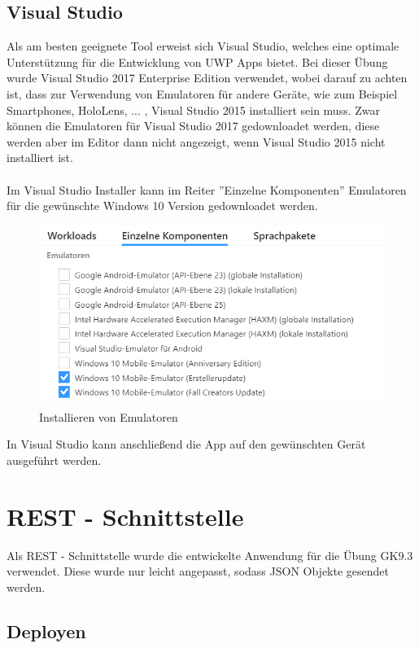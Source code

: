 \subsection{Visual Studio}

Als am besten geeignete Tool erweist sich Visual Studio, welches eine optimale Unterstützung für die Entwicklung von UWP Apps bietet. Bei dieser Übung wurde Visual Studio 2017 Enterprise Edition verwendet, wobei darauf zu achten ist, dass zur Verwendung von Emulatoren für andere Geräte, wie zum Beispiel Smartphones, HoloLens, ... , Visual Studio 2015 installiert sein muss. Zwar können die Emulatoren für Visual Studio 2017 gedownloadet werden, diese werden aber im Editor dann nicht angezeigt, wenn Visual Studio 2015 nicht installiert ist.
\\\\
Im Visual Studio Installer kann im Reiter ''Einzelne Komponenten'' Emulatoren für die gewünschte Windows 10 Version gedownloadet werden.

\begin{figure}[H]
	\centering
	\includegraphics[width=0.7\linewidth]{images/screenshot002}
	\caption{Installieren von Emulatoren}
	\label{fig:screenshot002}
\end{figure}

In Visual Studio kann anschließend die App auf den gewünschten Gerät ausgeführt werden.

\section{REST - Schnittstelle}

Als REST - Schnittstelle wurde die entwickelte Anwendung für die Übung GK9.3 verwendet. Diese wurde nur leicht angepasst, sodass JSON Objekte gesendet werden.

\subsection{Deployen}


